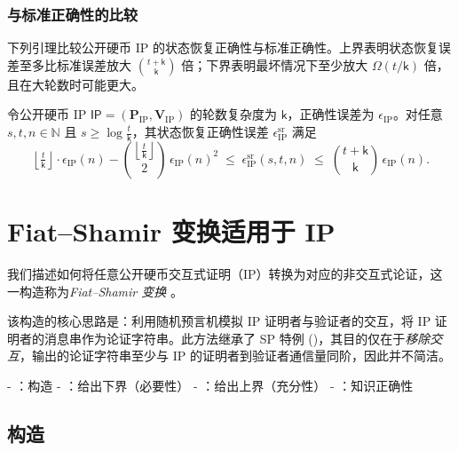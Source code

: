 \documentclass[american,singlepageview]{snargs-book-zh}
\newcommand{\floor}[1]{\left\lfloor{#1}\right\rfloor}
\newcommand{\Naturals}{\mathbb{N}}
\newcommand{\InstanceSize}{n}
\newcommand{\ProtoProver}{P}
\newcommand{\ProtoVerifier}{V}
\newcommand{\ProtoSoundnessError}{\epsilon}
\newcommand{\ProtoRoundComplexity}{\mathsf{k}}
\newcommand{\SRSuperscript}{\mathrm{sr}}
\newcommand{\ProtoSRSoundnessError}{\ProtoSoundnessError^{\SRSuperscript}}
\newcommand{\IPSymbol}{\mathsf{IP}}
\newcommand{\IPSystem}{(\IPProver,\IPVerifier)}
\newcommand{\IPSubscript}{\scriptscriptstyle\mathrm{IP}}
\newcommand{\IPFormat}[1]{\mathbf{#1}}
\newcommand{\IPProver}{\IPFormat{\ProtoProver}_{\IPSubscript}}
\newcommand{\IPVerifier}{\IPFormat{\ProtoVerifier}_{\IPSubscript}}
\newcommand{\IPSoundnessError}{\ProtoSoundnessError_{\IPSubscript}}
\newcommand{\IPRoundComplexity}{\ProtoRoundComplexity}
\newcommand{\SRBudget}{t}
\newcommand{\SRSaltSize}{s}
\newcommand{\IPSRSoundnessError}{\ProtoSRSoundnessError_{\IPSubscript}}
\begin{document}
\subsection{与标准正确性的比较}
\label{section:fs-sr-comparison}

下列引理比较公开硬币 IP 的状态恢复正确性与标准正确性。上界表明状态恢复误差至多比标准误差放大 $\binom{\SRBudget+\IPRoundComplexity}{\IPRoundComplexity}$ 倍；下界表明最坏情况下至少放大 $\Omega(\SRBudget/\IPRoundComplexity)$ 倍，且在大轮数时可能更大。

\begin{lemma}
\label{lemma:ip-sr-vs-standard}
令公开硬币 IP $\IPSymbol=\IPSystem$ 的轮数复杂度为 $\IPRoundComplexity$，正确性误差为 $\IPSoundnessError$。对任意 $\SRSaltSize,\SRBudget,\InstanceSize\in\Naturals$ 且 $\SRSaltSize\ge\log\frac{\SRBudget}{\IPRoundComplexity}$，其状态恢复正确性误差 $\IPSRSoundnessError$ 满足
\[
  \floor{\tfrac{\SRBudget}{\IPRoundComplexity}}\cdot\IPSoundnessError(\InstanceSize)
  -\binom{\floor{\tfrac{\SRBudget}{\IPRoundComplexity}}}{2}\,\IPSoundnessError(\InstanceSize)^{2}
  \;\le\;
  \IPSRSoundnessError(\SRSaltSize,\SRBudget,\InstanceSize)
  \;\le\;
  \binom{\SRBudget+\IPRoundComplexity}{\IPRoundComplexity}\,\IPSoundnessError(\InstanceSize).
\]
\end{lemma}


\chapter{Fiat--Shamir 变换适用于 IP}
\label{chapter:slow-fs-for-ip}

我们描述如何将任意公开硬币交互式证明（IP）转换为对应的非交互式论证，这一构造称为\emph{Fiat--Shamir 变换} \cite{FiatS86}。

该构造的核心思路是：利用随机预言机模拟 IP 证明者与验证者的交互，将 IP 证明者的消息串作为论证字符串。此方法继承了 SP 特例 ()，其目的仅在于\emph{移除交互}，输出的论证字符串至少与 IP 的证明者到验证者通信量同阶，因此并不简洁。

- ：构造  
- ：给出下界（必要性）  
- ：给出上界（充分性）  
- ：知识正确性  

\section{构造}
\label{section:slow-fs-for-ip}
\end{document}

